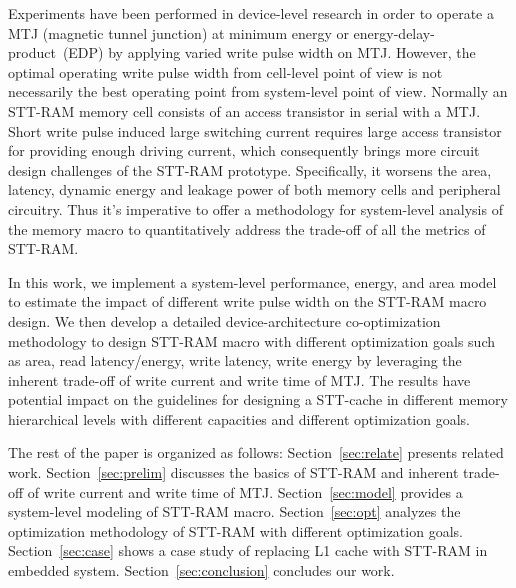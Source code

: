 Experiments have been performed in device-level research in order to operate a MTJ (magnetic tunnel junction) at minimum energy or energy-delay-product~(EDP) by applying varied write pulse width on MTJ. However, the optimal operating write pulse width from cell-level point of view is not necessarily the best operating point from system-level point of view. Normally an STT-RAM memory cell consists of an access transistor in serial with a MTJ. Short write pulse induced large switching current requires large access transistor for providing enough driving current, which consequently brings more circuit design challenges of the STT-RAM prototype. Specifically, it worsens the area, latency, dynamic energy and leakage power of both memory cells and peripheral circuitry.  Thus it's imperative to offer a methodology for system-level analysis of the memory macro to quantitatively address the trade-off of all the metrics of STT-RAM.

In this work, we implement a system-level performance, energy, and area model to estimate the impact of different write pulse width on the STT-RAM macro design. We then develop a detailed device-architecture co-optimization methodology to design STT-RAM macro with different optimization goals such as area, read latency/energy, write latency, write energy by leveraging the inherent trade-off of write current and write time of MTJ. The results have potential impact on the guidelines for designing a STT-cache in different memory hierarchical levels with different capacities and different optimization goals.

The rest of the paper is organized as follows: Section~\ref{sec:relate} presents related work. Section~\ref{sec:prelim} discusses the basics of STT-RAM and inherent trade-off of write current and write time of MTJ. Section~\ref{sec:model} provides a system-level modeling of STT-RAM macro. Section~\ref{sec:opt} analyzes the optimization methodology of STT-RAM with different optimization goals. Section~\ref{sec:case} shows a case study of replacing L1 cache with STT-RAM in embedded system. Section~\ref{sec:conclusion} concludes our work.

\begin{comment}
Comment Paragraph
\end{comment} 